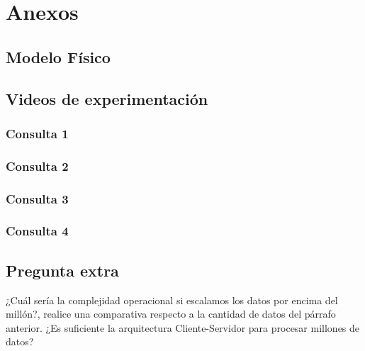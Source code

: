 \section{Anexos}
\subsection{Modelo Físico}
\subsection{Videos de experimentación}
\subsubsection{Consulta 1}
\subsubsection{Consulta 2}
\subsubsection{Consulta 3}
\subsubsection{Consulta 4}
\subsection{Pregunta extra}
¿Cuál sería la complejidad operacional si escalamos los datos por encima del millón?, realice una comparativa respecto a la cantidad de datos del párrafo anterior. ¿Es suficiente la arquitectura Cliente-Servidor para procesar millones de datos?